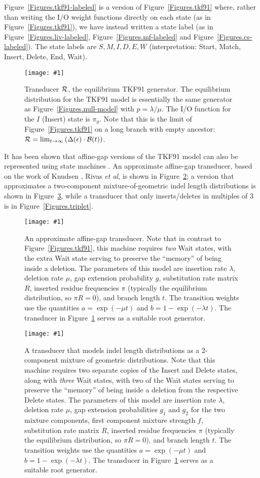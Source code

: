 \documentclass{article}
\newcommand{\figref}[1]{Figure~\ref{Figures.#1}}
\newcommand{\figlabel}[1]{\label{Figures.#1}}
\newcommand{\easyfig}[4]{
\begin{figure}
\texttt{[image: \#1]}
\caption{ \figlabel{#3} #4}
\end{figure}}
\newcommand{\widepdffig}[2]{\easyfig{#1-fig.pdf}{width=\textwidth}{#1}{#2}}
\newcommand\tkf{{\cal B}}
\newcommand\tkfroot{{\cal R}}
\newcommand\generate{\Delta}
\begin{document}
\figref{tkf91-labeled} is a version of \figref{tkf91}
where, rather than writing the I/O weight functions directly on each state (as in \figref{tkf91}),
we have instead written a state label (as in \figref{liv-labeled}, \figref{mf-labeled} and \figref{cs-labeled}).
The state labels are $S,M,I,D,E,W$ (interpretation: Start, Match, Insert, Delete, End, Wait).

\widepdffig{tkf91-root}{Transducer $\tkfroot$, the equilibrium TKF91 generator.
The equilibrium distribution for the TKF91 model is essentially the same generator as \figref{null-model} with $p=\lambda/\mu$.
The I/O function for the $I$ (Insert) state is $\pi_y$.
Note that this is the limit of \figref{tkf91} on a long branch with empty ancestor:
$\tkfroot = \lim_{t\to\infty} \left( \generate(\epsilon) \cdot \tkf(t) \right)$.
}

It has been shown that affine-gap versions of the TKF91 model can also be represented using state machines \cite{MiklosLunterHolmes2004}.
An approximate affine-gap transducer, based on the work of Knudsen \cite{KnudsenMiyamoto2003}, Rivas \cite{Rivas05} {\em et al}, is shown in \figref{protpal};
a version that approximates a two-component mixture-of-geometric indel length distributions is shown in \figref{protpal-mix2},
while a transducer that only inserts/deletes in multiples of 3 is in \figref{triplet}.

\widepdffig{protpal}{An approximate affine-gap transducer.
Note that in contrast to \figref{tkf91}, this machine requires {\em two} Wait states,
with the extra Wait state serving to preserve the ``memory'' of being inside a deletion.
The parameters of this model are insertion rate $\lambda$, deletion rate $\mu$, gap extension probability $g$,
substitution rate matrix $R$, inserted residue frequencies $\pi$ (typically the equilibrium distribution, so $\pi R = 0$), and branch length $t$.
The transition weights use the quantities
$a = \exp(-\mu t)$ and $b = 1 - \exp(-\lambda t)$.
The transducer in \figref{tkf91-root} serves as a suitable root generator.
}

\widepdffig{protpal-mix2}{A transducer that models indel length distributions as a 2-component mixture of geometric distributions.
Note that this machine requires
two separate copies of the Insert and Delete states, along with {\em three} Wait states,
with two of the Wait states serving to preserve the ``memory'' of being inside a deletion from the respective Delete states.
The parameters of this model are insertion rate $\lambda$, deletion rate $\mu$, gap extension probabilities $g_1$ and $g_2$ for the two mixture components,
first component mixture strength $f$, substitution rate matrix $R$, inserted residue frequencies $\pi$ (typically the equilibrium distribution, so $\pi R = 0$), and branch length $t$.
The transition weights use the quantities
$a = \exp(-\mu t)$ and $b = 1 - \exp(-\lambda t)$.
The transducer in \figref{tkf91-root} serves as a suitable root generator.
}
\end{document}
